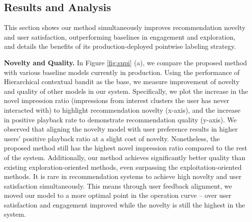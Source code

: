 \documentclass[11pt]{article}
\begin{document}



\subsection{Results and Analysis}
This section shows our method simultaneously improves recommendation novelty and user satisfaction, outperforming baselines in engagement and exploration, and details the benefits of its production-deployed pointwise labeling strategy.

\smallskip
\smallskip
\noindent\textbf{Novelty and Quality.} In Figure \ref{fig:supi} (a), we compare the proposed method with various baseline models currently in production. Using the performance of Hierarchical contextual bandit \cite{song2022show} as the base, we measure improvement of novelty and quality of other models in our system. Specifically, we plot the increase in the novel impression ratio (impressions from interest clusters the user has never interacted with) to highlight recommendation novelty (x-axis), and the increase in positive playback rate to demonstrate recommendation quality (y-axis). We observed that aligning the novelty model with user preference results in higher users' positive playback ratio at a slight cost of novelty. Nonetheless, the proposed method still has the highest novel impression ratio compared to the rest of the system. Additionally, our method achieves significantly better quality than existing exploration-oriented methods, even surpassing the exploitation-oriented methods. It is rare in recommendation systems to achieve high novelty and user satisfaction simultaneously. This means through user feedback alignment, we moved our model to a more optimal point in the operation curve -- over user satisfaction and engagement improved while the novelty is still the highest in the system.
\end{document}
